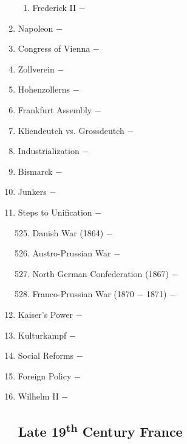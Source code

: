 \documentclass[12pt]{article}
\begin{document}
\begin{enumerate}
\begin{enumerate}[label=\arabic{*}.]
\item Frederick II $-$ 

\end{enumerate}
\setcounter{enumi}{514}

\item Napoleon $-$ 

\item Congress of Vienna $-$ 

\item Zollverein $-$ 

\item Hohenzollerns $-$ 

\item Frankfurt Assembly $-$ 

\item Kliendeutch vs. Grossdeutch $-$ 

\item Industrialization $-$ 

\item Bismarck $-$ 

\item Junkers $-$ 

\item Steps to Unification $-$ 

\begin{enumerate}[label=\arabic{*}.]
\setcounter{enumii}{524}

\item Danish War (1864) $-$ 

\item Austro-Prussian War $-$ 

\item North German Confederation (1867) $-$ 

\item Franco-Prussian War (1870 $-$ 1871) $-$ 

\end{enumerate}
\setcounter{enumi}{528}


\item Kaiser's Power $-$ 

\item Kulturkampf $-$ 

\item Social Reforms $-$ 

\item Foreign Policy $-$ 

\item Wilhelm II $-$ 

\subsection{Late 19\textsuperscript{th} Century France}


\end{enumerate}
\end{document}
